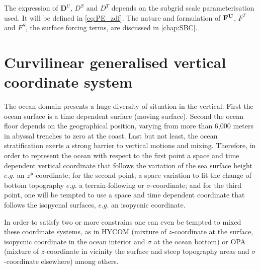 \documentclass[../main/NEMO_manual]{subfiles}
\begin{document}
The expression of \textbf{D}$^{U}$, $D^{S}$ and $D^{T}$ depends on the subgrid scale parameterisation used.
It will be defined in \autoref{eq:PE_zdf}.
The nature and formulation of ${\rm {\bf F}}^{\rm {\bf U}}$, $F^T$ and $F^S$, the surface forcing terms,
are discussed in \autoref{chap:SBC}.


\newpage 

\section{Curvilinear generalised vertical coordinate system}
\label{sec:PE_gco}

The ocean domain presents a huge diversity of situation in the vertical.
First the ocean surface is a time dependent surface (moving surface).
Second the ocean floor depends on the geographical position,
varying from more than 6,000 meters in abyssal trenches to zero at the coast.
Last but not least, the ocean stratification exerts a strong barrier to vertical motions and mixing. 
Therefore, in order to represent the ocean with respect to
the first point a space and time dependent vertical coordinate that follows the variation of the sea surface height
$e.g.$ an $z$*-coordinate;
for the second point, a space variation to fit the change of bottom topography
$e.g.$ a terrain-following or $\sigma$-coordinate;
and for the third point, one will be tempted to use a space and time dependent coordinate that
follows the isopycnal surfaces, $e.g.$ an isopycnic coordinate.

In order to satisfy two or more constrains one can even be tempted to mixed these coordinate systems, as in
HYCOM (mixture of $z$-coordinate at the surface, isopycnic coordinate in the ocean interior and $\sigma$ at
the ocean bottom) \citep{Chassignet_al_JPO03} or
OPA (mixture of $z$-coordinate in vicinity the surface and steep topography areas and $\sigma$-coordinate elsewhere)
\citep{Madec_al_JPO96} among others.
\end{document}
